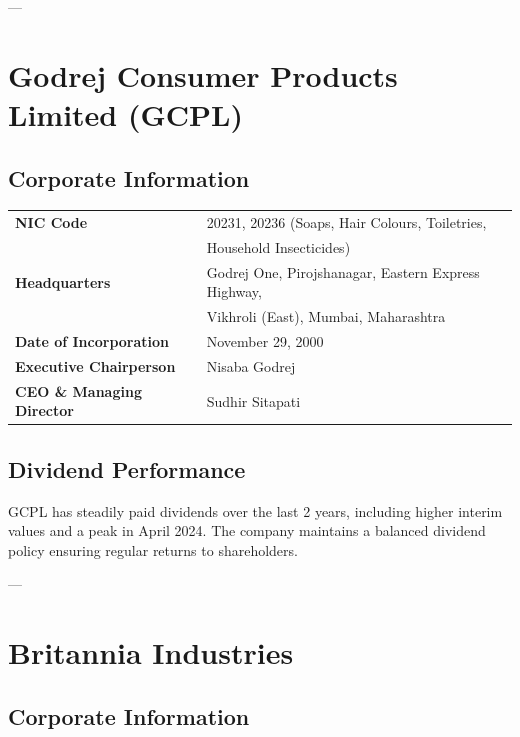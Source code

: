 \documentclass[12pt, a4paper]{report}
\begin{document}
---

\section{Godrej Consumer Products Limited (GCPL)}

\subsection{Corporate Information}

\begin{tabular}{ll}
    \textbf{NIC Code} & 20231, 20236 (Soaps, Hair Colours, Toiletries, \\
                      & Household Insecticides) \\
    \textbf{Headquarters} & Godrej One, Pirojshanagar, Eastern Express Highway, \\
                          & Vikhroli (East), Mumbai, Maharashtra \\
    \textbf{Date of Incorporation} & November 29, 2000 \\
    \textbf{Executive Chairperson} & Nisaba Godrej \\
    \textbf{CEO \& Managing Director} & Sudhir Sitapati \\
\end{tabular}

\subsection{Dividend Performance}

GCPL has steadily paid dividends over the last 2 years, including higher interim values and a peak in April 2024. The company maintains a balanced dividend policy ensuring regular returns to shareholders.

---

\section{Britannia Industries}

\subsection{Corporate Information}
\end{document}
